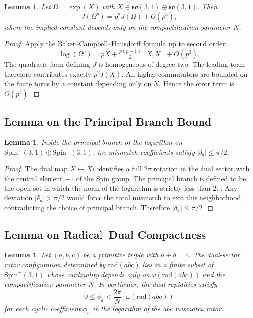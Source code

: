 \documentclass[dvipdfmx,a4paper]{article}
\newtheorem{lemma}[theorem]{Lemma}
\theoremstyle{definition}
\theoremstyle{remark}
\begin{document}
\begin{lemma}
Let \( \Omega = \exp(X) \) with \( X \in \mathfrak{so}(3,1) \oplus \mathfrak{so}(3,1) \). Then
\[
J(\Omega^p) = p^2 J(\Omega) + O(p^3),
\]
where the implied constant depends only on the compactification parameter \( N \).
\end{lemma}

\begin{proof}
Apply the Baker--Campbell--Hausdorff formula up to second order:
\[
\log(\Omega^p) = pX + \tfrac{p(p-1)}{2}[X,X] + O(p^3).
\]
The quadratic form defining \( J \) is homogeneous of degree two. The leading term therefore contributes exactly \( p^2 J(X) \). All higher commutators are bounded on the finite torus by a constant depending only on \( N \). Hence the error term is \( O(p^3) \).
\end{proof}

\subsection{Lemma on the Principal Branch Bound}

\begin{lemma}
Inside the principal branch of the logarithm on \( \mathrm{Spin}^+(3,1) \oplus \mathrm{Spin}^+(3,1) \), the mismatch coefficients satisfy \( |\delta_a| \leq \pi/2 \).
\end{lemma}

\begin{proof}
The dual map \( X \mapsto Xi \) identifies a full \( 2\pi \) rotation in the dual sector with the central element \( -1 \) of the Spin group. The principal branch is defined to be the open set in which the norm of the logarithm is strictly less than \( 2\pi \). Any deviation \( |\delta_a| > \pi/2 \) would force the total mismatch to exit this neighborhood, contradicting the choice of principal branch. Therefore \( |\delta_a| \leq \pi/2 \).
\end{proof}

\subsection{Lemma on Radical--Dual Compactness}
\label{lem:radical-dual}

\begin{lemma}
Let \( (a,b,c) \) be a primitive triple with \( a + b = c \). The dual-sector rotor configuration determined by \( \mathrm{rad}(abc) \) lies in a finite subset of \( \mathrm{Spin}^+(3,1) \) whose cardinality depends only on \( \omega(\mathrm{rad}(abc)) \) and the compactification parameter \( N \). In particular, the dual rapidities satisfy
\[
0 \leq \phi_a < \frac{2\pi}{N} \cdot \omega(\mathrm{rad}(abc))
\]
for each cyclic coefficient \( \phi_a \) in the logarithm of the abc mismatch rotor.
\end{lemma}
\end{document}
